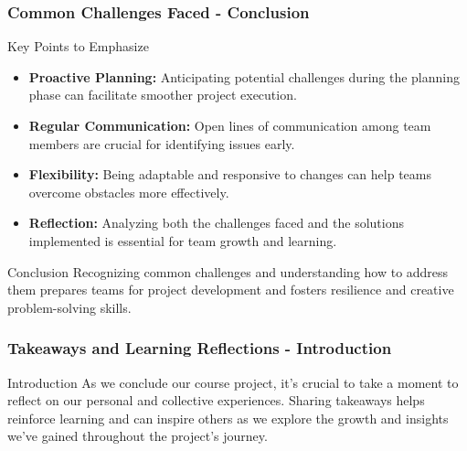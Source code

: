 \documentclass[aspectratio=169]{beamer}
\begin{document}
\begin{frame}[fragile]
    \frametitle{Common Challenges Faced - Conclusion}
    \begin{block}{Key Points to Emphasize}
        \begin{itemize}
            \item \textbf{Proactive Planning:} Anticipating potential challenges during the planning phase can facilitate smoother project execution.
            \item \textbf{Regular Communication:} Open lines of communication among team members are crucial for identifying issues early.
            \item \textbf{Flexibility:} Being adaptable and responsive to changes can help teams overcome obstacles more effectively.
            \item \textbf{Reflection:} Analyzing both the challenges faced and the solutions implemented is essential for team growth and learning.
        \end{itemize}
    \end{block}
    
    \begin{block}{Conclusion}
        Recognizing common challenges and understanding how to address them prepares teams for project development and fosters resilience and creative problem-solving skills.
    \end{block}
\end{frame}

\begin{frame}[fragile]
  \frametitle{Takeaways and Learning Reflections - Introduction}
  \begin{block}{Introduction}
    As we conclude our course project, it's crucial to take a moment to reflect on our personal and collective experiences. 
    Sharing takeaways helps reinforce learning and can inspire others as we explore the growth and insights we’ve gained throughout the project's journey.
  \end{block}
\end{frame}
\end{document}
